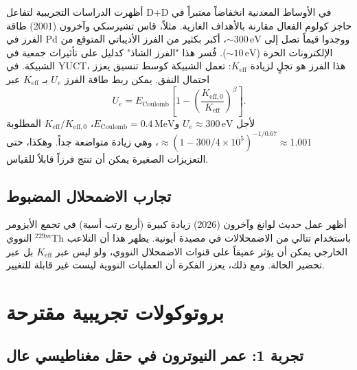 \documentclass[11pt,a4paper]{article}
\newcommand{\Keff}{K_{\mathrm{eff}}}
\newcommand{\Keffzero}{K_{\mathrm{eff},0}}
\theoremstyle{remark}
\begin{document}
	أظهرت الدراسات التجريبية لتفاعل D+D في الأوساط المعدنية انخفاضاً معتبراً في حاجز كولوم الفعال مقارنة بالأهداف الغازية. مثلاً، قاس تشيرسكي وآخرون (2001) طاقة الفرز في Pd ووجدوا قيماً تصل إلى \(\sim 300\,\text{eV}\)، أكبر بكثير من الفرز الأديباتي المتوقع من الإلكترونات الحرة (\(\sim 10\,\text{eV}\)). فُسر هذا "الفرز الشاذ" كدليل على تأثيرات جمعية في الشبيكة. في YUCT، هذا الفرز هو تجلٍ لزيادة \(\Keff\): تعمل الشبيكة كوسط تنسيق يعزز احتمال النفق. يمكن ربط طاقة الفرز \(U_e\) بـ \(\Keff\) عبر
	\begin{equation}
		U_e = E_{\text{Coulomb}} \left[1 - \left(\frac{\Keffzero}{\Keff}\right)^{\beta}\right].
	\end{equation}
	لأجل \(U_e \approx 300\,\text{eV}\) و\(E_{\text{Coulomb}} = 0.4\,\text{MeV}\)، \(\Keff/\Keffzero\) المطلوبة \(\approx (1 - 300/4\times10^5)^{-1/0.67} \approx 1.001\)، وهي زيادة متواضعة جداً. وهكذا، حتى التعزيزات الصغيرة يمكن أن تنتج فرزاً قابلاً للقياس.
	
	\subsection{تجارب الاضمحلال المضبوط}
	
	أظهر عمل حديث لوانغ وآخرون (2026) زيادة كبيرة (أربع رتب أسية) في تجمع الأيزومر النووي \(^{229m}\)Th باستخدام تتالي من الاضمحلالات في مصيدة أيونية. يظهر هذا أن التلاعب الخارجي يمكن أن يؤثر عميقاً على قنوات الاضمحلال النووي، ولو ليس عبر \(\Keff\) بل عبر تحضير الحالة. ومع ذلك، يعزز الفكرة أن العمليات النووية ليست غير قابلة للتغيير.
	
	\section{بروتوكولات تجريبية مقترحة}
	\label{sec:experiments}
	
	\subsection{تجربة 1: عمر النيوترون في حقل مغناطيسي عال}
	
\end{document}
